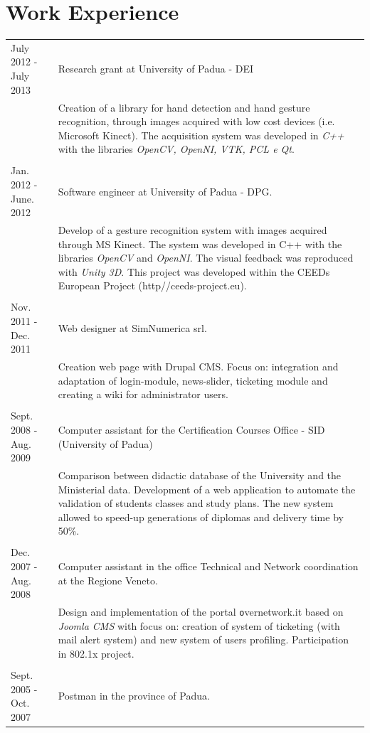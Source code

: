 \documentclass[pdftex,a4paper,10pt,twoside,titlepage]{article}
\begin{document}
\section*{Work Experience}
\begin{tabular}[h]{l p{}}
\footnotesize{July 2012 - July 2013} & Research grant at University of Padua - DEI \\
 & Creation of a library for hand detection and hand gesture recognition, 
 through images acquired with low cost devices  (i.e. Microsoft Kinect). The acquisition system was
developed in \textit{C++} with the libraries \textit{OpenCV, OpenNI, VTK, PCL e Qt}.\\
 & \\
\footnotesize{Jan. 2012 - June. 2012} & Software engineer at University of Padua - DPG.\\
& Develop of a gesture recognition system with images acquired through MS Kinect. The system was
developed in C++ with the libraries \textit{OpenCV} and \textit{OpenNI}. The visual feedback was reproduced with \textit{Unity 3D}.
This project was developed within the CEEDs European Project (http//ceeds-project.eu).\\
&\\
\footnotesize{Nov. 2011 - Dec. 2011} & Web designer at SimNumerica srl.\\
& Creation web page with Drupal CMS. Focus on: integration and adaptation of login-module, news-slider, 
		ticketing module and creating a wiki for administrator users. \\
&\\
\footnotesize{Sept. 2008 - Aug. 2009} &  Computer assistant for the Certification Courses Office - SID (University of Padua)\\
& Comparison between didactic database of the University and the Ministerial data.
 Development of a web application to automate the validation of students classes and study plans. The new system allowed
 to speed-up generations of diplomas and delivery time by 50\%.\\
&\\
\footnotesize{Dec. 2007  -  Aug. 2008} & Computer assistant in the office Technical and Network coordination at the Regione Veneto.\\
 & Design and implementation of the portal {\texttt overnetwork.it} based on \textit{Joomla CMS}
  with focus on: creation of system of ticketing (with mail alert system) and new system of users profiling. Participation in 802.1x project.\\
&\\
\footnotesize{Sept. 2005 - Oct. 2007} & Postman in the province of Padua.
\end{tabular} 
\end{document}
